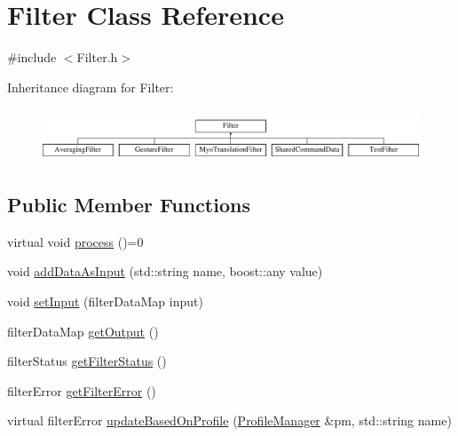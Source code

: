 \hypertarget{class_filter}{\section{Filter Class Reference}
\label{class_filter}
}


{\ttfamily \#include $<$Filter.\+h$>$}

Inheritance diagram for Filter\+:\begin{figure}[H]
\begin{center}
\leavevmode
\includegraphics[height=1.577465cm]{class_filter}
\end{center}
\end{figure}
\subsection*{Public Member Functions}
\begin{DoxyCompactItemize}
\item 
virtual void \hyperlink{class_filter_a2f7afde0413c71a3e4947a0537ca8996}{process} ()=0
\item 
void \hyperlink{class_filter_a0d0f589585c96b4f0fcb1edb0454b958}{add\+Data\+As\+Input} (std\+::string name, boost\+::any value)
\item 
void \hyperlink{class_filter_a0b37fbd71bd25629f9476d61912ad038}{set\+Input} (filter\+Data\+Map input)
\item 
filter\+Data\+Map \hyperlink{class_filter_a3da920ba56f06a1ff15f6da0f298f8db}{get\+Output} ()
\item 
filter\+Status \hyperlink{class_filter_a547427e3f17dbb64a401881bed56088c}{get\+Filter\+Status} ()
\item 
filter\+Error \hyperlink{class_filter_a833dd72086569814cab3316c9354063a}{get\+Filter\+Error} ()
\item 
virtual filter\+Error \hyperlink{class_filter_a9ec2fbdbabb60c91e32048ebe386e372}{update\+Based\+On\+Profile} (\hyperlink{class_profile_manager}{Profile\+Manager} \&pm, std\+::string name)
\end{DoxyCompactItemize}
